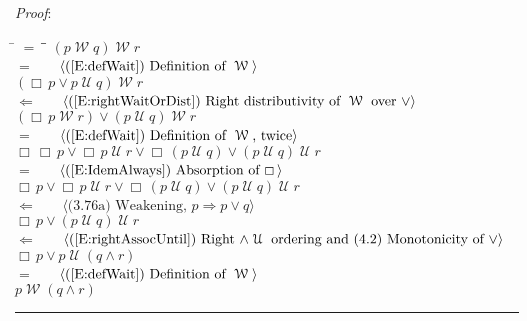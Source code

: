 \documentclass[12pt, fleqn, leqno]{article}
\newcommand{\lgap}{2pt}                             %
\newcommand{\mymathindent}{24pt}                    %
\newcommand{\impl}{\ensuremath{\Rightarrow}}        %
\newcommand{\foll}{\ensuremath{\Leftarrow}}         %
\newcommand{\Until}{\;\mathcal{U}\;}
\newcommand{\Wait}{\;\mathcal{W}\;}
\newcommand{\Always}{\Box\,}
\newcommand{\myqed}{\rule[-.23ex]{1.2ex}{2.0ex}}
\newcommand{\myqedtab}{\hspace{384pt}}              %
\newcommand{\Gll} {\langle}                         %
\newcommand{\Ggg} {\rangle}                         %
\newcommand{\Hint}[1]     {\ \ \ $\Gll              \mbox{#1} \Ggg$ }   %
\begin{document}
\emph{Proof}:
\begin{tabbing}
\hspace{\mymathindent} \= $= \;$ \= \myqedtab \= \kill
\> \>   $(p \Wait q) \Wait r$\\[\lgap]
\> $=$ \> \Hint{(\ref{E:defWait}) Definition of $\Wait$} \\[\lgap]
\> \>   $(\Always p \lor p\Until q) \Wait r$\\[\lgap]
\> $\foll$ \> \Hint{(\ref{E:rightWaitOrDist}) Right distributivity of $\Wait$ over $\lor$} \\[\lgap]
\> \>   $(\Always p\Wait r) \lor (p\Until q) \Wait r$\\[\lgap]
\> $=$ \> \Hint{(\ref{E:defWait}) Definition of $\Wait$, twice} \\[\lgap]
\> \>   $\Always\Always p\lor \Always p\Until r \lor \Always(p\Until q)\lor (p\Until q)\Until r$\\[\lgap]
\> $=$  \>  \Hint{(\ref{E:IdemAlways}) Absorption of $\Always$}\\[\lgap]
\> \>   $\Always p\lor \Always p\Until r \lor \Always(p\Until q)\lor (p\Until q)\Until r$\\[\lgap]
\> $\foll$ \> \Hint{(3.76a) Weakening, $p\impl p\lor q$} \\[\lgap]
\> \>   $\Always p\lor (p\Until q)\Until r$\\[\lgap]
\> $\foll$ \> \Hint{(\ref{E:rightAssocUntil}) Right $\land \Until$ ordering and (4.2) Monotonicity of $\lor$} \\[\lgap]
\> \>   $\Always p\lor p\Until (q\land r)$\\[\lgap]
\> $=$ \> \Hint{(\ref{E:defWait}) Definition of $\Wait$} \\[\lgap]
\> \>   $p \Wait (q \land r)$ \quad \myqed
\end{tabbing}
\end{document}
